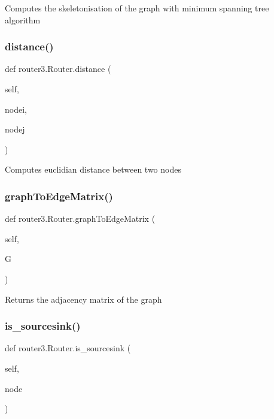 \begin{DoxyVerb}Computes the skeletonisation of the graph with minimum spanning tree algorithm
\end{DoxyVerb}
 \mbox{\label{classrouter3_1_1_router_aa010905a9b4102ed39a19a10e995c836}} 
\subsubsection{distance()}
{\footnotesize\ttfamily def router3.\+Router.\+distance (\begin{DoxyParamCaption}\item[{}]{self,  }\item[{}]{nodei,  }\item[{}]{nodej }\end{DoxyParamCaption})}

\begin{DoxyVerb}Computes euclidian distance between two nodes
\end{DoxyVerb}
 \mbox{\label{classrouter3_1_1_router_a3f3849851bec7f50d3ed0a6e27f65443}} 
\subsubsection{graph\+To\+Edge\+Matrix()}
{\footnotesize\ttfamily def router3.\+Router.\+graph\+To\+Edge\+Matrix (\begin{DoxyParamCaption}\item[{}]{self,  }\item[{}]{G }\end{DoxyParamCaption})}

\begin{DoxyVerb}Returns the adjacency matrix of the graph
\end{DoxyVerb}
 \mbox{\label{classrouter3_1_1_router_aa28f9c687b0cdb85af036926c26f507e}} 
\subsubsection{is\+\_\+sourcesink()}
{\footnotesize\ttfamily def router3.\+Router.\+is\+\_\+sourcesink (\begin{DoxyParamCaption}\item[{}]{self,  }\item[{}]{node }\end{DoxyParamCaption})}

